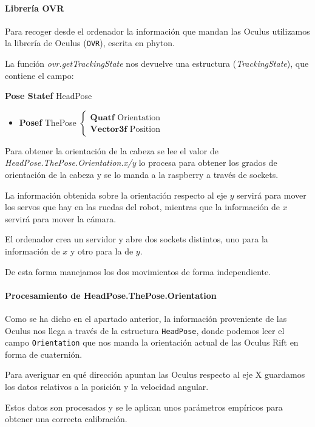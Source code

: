 \documentclass[twoside, 11pt]{epstfg}
\begin{document}
\paragraph{Librería OVR}
Para recoger desde el ordenador la información que mandan las Oculus utilizamos la librería de Oculus (\texttt{OVR}), escrita en phyton.

La función \textit{ovr.getTrackingState} nos devuelve una estructura (\textit{TrackingState}), que contiene el campo:

\textbf{Pose Statef} HeadPose 
\begin{itemize}
	\item \textbf{Posef} ThePose $\begin{cases}
	\textbf{Quatf} \text{ Orientation}\\
	\textbf{Vector3f}\text{ Position} 
	\end{cases}$
	
	
\end{itemize}

Para obtener la orientación de la cabeza se lee el valor de \textit{HeadPose.ThePose.Orientation.x/y} lo procesa para obtener los grados de orientación de la cabeza y se lo manda a la raspberry a través de sockets.

La información obtenida sobre la orientación respecto al eje $y$ servirá para mover los servos que hay en las ruedas del robot, mientras que la información de $x$ servirá para mover la cámara.


El ordenador crea un servidor y abre dos sockets distintos, uno para la información de $x$ y otro para la de $y$.


De esta forma manejamos los dos movimientos de forma independiente.


\paragraph{Procesamiento de HeadPose.ThePose.Orientation}

Como se ha dicho en el apartado anterior, la información proveniente de las Oculus nos llega a través de la estructura \texttt{HeadPose}, donde podemos leer el campo \texttt{Orientation} que nos manda la orientación actual de las Oculus Rift en forma de cuaternión.

Para averiguar en qué dirección apuntan las Oculus respecto al eje X guardamos los datos relativos a la posición y la velocidad angular.

 Estos datos son procesados y se le aplican unos parámetros empíricos para obtener una correcta calibración.
\end{document}
